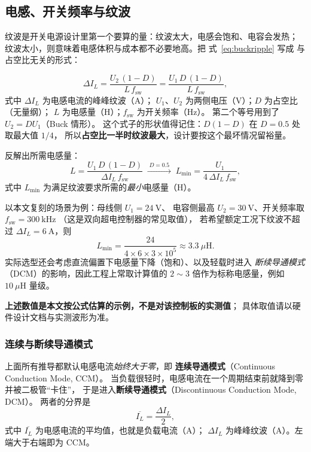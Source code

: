 \documentclass[cn,blue,11pt,device=normal]{elegantnote}
\newcommand{\fref}[1]{式~\eqref{#1}}
\begin{document}
\subsection{电感、开关频率与纹波}

纹波是开关电源设计里第一个要算的量：纹波太大，电感会饱和、电容会发热；
纹波太小，则意味着电感体积与成本都不必要地高。把 \fref{eq:buckripple} 写成
与占空比无关的形式：

\begin{equation}\label{eq:ripplegen}
  \Delta I_L = \frac{U_2\,(1-D)}{L\,f_{\mathrm{sw}}}
             = \frac{U_1\,D\,(1-D)}{L\,f_{\mathrm{sw}}} ,
\end{equation}
式中 $\Delta I_L$ 为电感电流的峰峰纹波（A）；
$U_1$、$U_2$ 为两侧电压（V）；$D$ 为占空比（无量纲）；
$L$ 为电感量（H）；$f_{\mathrm{sw}}$ 为开关频率（Hz）。
第二个等号用到了 $U_2=DU_1$（Buck 情形）。
这个式子的形状值得记住：$D(1-D)$ 在 $D=0.5$ 处取最大值 $1/4$，
所以\textbf{占空比一半时纹波最大}，设计要按这个最坏情况留裕量。

反解出所需电感量：
\begin{equation}\label{eq:Lchoose}
  L = \frac{U_1\,D\,(1-D)}{\Delta I_L\,f_{\mathrm{sw}}}
    \;\xrightarrow{\;D=0.5\;}\;
    L_{\min} = \frac{U_1}{4\,\Delta I_L\,f_{\mathrm{sw}}} ,
\end{equation}
式中 $L_{\min}$ 为满足纹波要求所需的\emph{最小}电感量（H）。

\begin{note}[一组估算示例]
以本文复刻的场景为例：母线侧 $U_1=24\ \mathrm{V}$、
电容侧最高 $U_2=30\ \mathrm{V}$、开关频率取 $f_{\mathrm{sw}}=300\ \mathrm{kHz}$
（这是双向超电控制器的常见取值），
若希望额定工况下纹波不超过 $\Delta I_L=6\ \mathrm{A}$，则
\begin{equation}
  L_{\min} = \frac{24}{4\times 6\times 3\times10^{5}} \approx 3.3\ \mu\mathrm{H}.
\end{equation}
实际选型还会考虑直流偏置下电感量下降（饱和）、以及轻载时进入
\emph{断续导通模式}（DCM）的影响，因此工程上常取计算值的
$2\sim3$ 倍作为标称电感量，例如 $10\ \mu\mathrm{H}$ 量级。

\textbf{上述数值是本文按公式估算的示例，不是对该控制板的实测值}；
具体取值请以硬件设计文档与实测波形为准。
\end{note}

\subsubsection{连续与断续导通模式}

上面所有推导都默认电感电流\emph{始终大于零}，即
\textbf{连续导通模式}（Continuous Conduction Mode, CCM）。
当负载很轻时，电感电流在一个周期结束前就降到零并被二极管“卡住”，
于是进入\textbf{断续导通模式}（Discontinuous Conduction Mode, DCM）。
两者的分界是
\begin{equation}\label{eq:ccmbound}
  \overline{I_L} = \frac{\Delta I_L}{2} ,
\end{equation}
式中 $\overline{I_L}$ 为电感电流的平均值，也就是负载电流（A）；
$\Delta I_L$ 为峰峰纹波（A）。左端大于右端即为 CCM。
\end{document}
